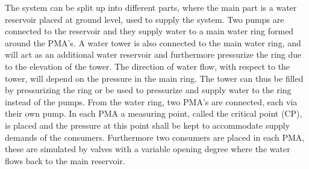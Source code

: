 The system can be split up into different parts, where the main part is a water reservoir placed at ground level, used to supply the system. Two pumps are connected to the reservoir and they supply water to a main water ring formed around the PMA's. 
A water tower is also connected to the main water ring, and will act as an additional water reservoir and furthermore pressurize the ring due to the elevation of the tower. The direction of water flow, with respect to the tower, will depend on the pressure in the main ring. The tower can thus be filled by pressurizing the ring or be used to pressurize and supply water to the ring instead of the pumps.  
From the water ring, two PMA's are connected, each via their own pump. In each PMA a measuring point, called the critical point (CP), is placed and the pressure at this point shall be kept to accommodate supply demands of the consumers. Furthermore two consumers are placed in each PMA, these are simulated by valves with a variable opening degree where the water flows back to the main reservoir.    

	
